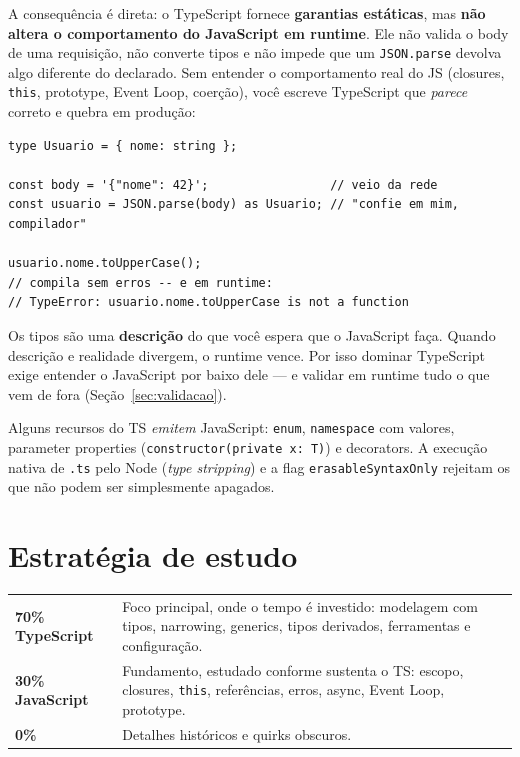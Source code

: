 \documentclass[12pt,a4paper,oneside]{book}
\newcommand{\code}[1]{\texttt{#1}}
\begin{document}
A consequência é direta: o TypeScript fornece \textbf{garantias estáticas}, mas \textbf{não altera o comportamento do JavaScript em runtime}. Ele não valida o body de uma requisição, não converte tipos e não impede que um \code{JSON.parse} devolva algo diferente do declarado. Sem entender o comportamento real do JS (closures, \code{this}, prototype, Event Loop, coerção), você escreve TypeScript que \emph{parece} correto e quebra em produção:

\begin{verbatim}
type Usuario = { nome: string };

const body = '{"nome": 42}';                 // veio da rede
const usuario = JSON.parse(body) as Usuario; // "confie em mim, compilador"

usuario.nome.toUpperCase();
// compila sem erros -- e em runtime:
// TypeError: usuario.nome.toUpperCase is not a function
\end{verbatim}

\begin{nota}
Os tipos são uma \textbf{descrição} do que você espera que o JavaScript faça. Quando descrição e realidade divergem, o runtime vence. Por isso dominar TypeScript exige entender o JavaScript por baixo dele --- e validar em runtime tudo o que vem de fora (Seção~\ref{sec:validacao}).
\end{nota}

\begin{nota}
Alguns recursos do TS \emph{emitem} JavaScript: \code{enum}, \code{namespace} com valores, parameter properties (\code{constructor(private x: T)}) e decorators. A execução nativa de \code{.ts} pelo Node (\emph{type stripping}) e a flag \code{erasableSyntaxOnly} rejeitam os que não podem ser simplesmente apagados.
\end{nota}

\chapter{Estratégia de estudo}

\begin{tabularx}{\textwidth}{@{}lX@{}}
\toprule
\textbf{70\% TypeScript} & Foco principal, onde o tempo é investido: modelagem com tipos, narrowing, generics, tipos derivados, ferramentas e configuração. \\
\textbf{30\% JavaScript} & Fundamento, estudado conforme sustenta o TS: escopo, closures, \code{this}, referências, erros, async, Event Loop, prototype. \\
\textbf{0\%} & Detalhes históricos e quirks obscuros. \\
\bottomrule
\end{tabularx}
\end{document}
